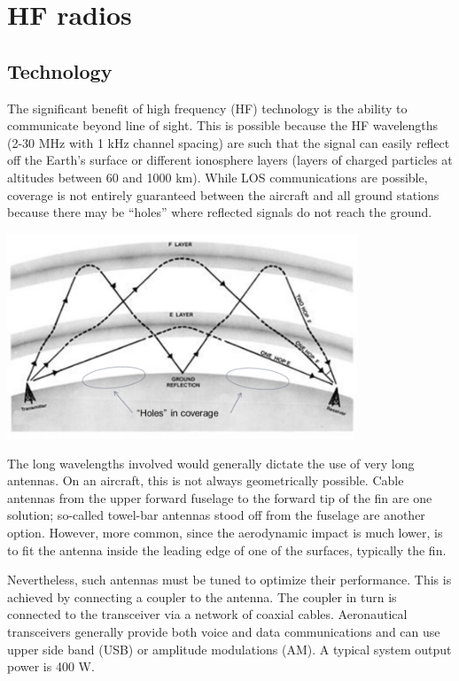 \documentclass[
]{book}
\begin{document}
\hypertarget{hf-radios}{%
\section{HF radios}\label{hf-radios}}

\hypertarget{technology-1}{%
\subsection{Technology}\label{technology-1}}

The significant benefit of high frequency (HF) technology is the ability to
communicate beyond line of sight. This is possible because the HF wavelengths
(2-30 MHz with 1 kHz channel spacing) are such that the signal can easily
reflect off the Earth's surface or different ionosphere layers (layers of
charged particles at altitudes between 60 and 1000 km). While LOS
communications are possible, coverage is not entirely guaranteed between the
aircraft and all ground stations because there may be ``holes'' where reflected
signals do not reach the ground.

\includegraphics[width=4.11in,height=2.41in]{media/20/image5.png}

The long wavelengths involved would generally dictate the use of very long
antennas. On an aircraft, this is not always geometrically possible. Cable
antennas from the upper forward fuselage to the forward tip of the fin are one
solution; so-called towel-bar antennas stood off from the fuselage are another
option. However, more common, since the aerodynamic impact is much lower, is to
fit the antenna inside the leading edge of one of the surfaces, typically the
fin.

Nevertheless, such antennas must be tuned to optimize their performance. This
is achieved by connecting a coupler to the antenna. The coupler in turn is
connected to the transceiver via a network of coaxial cables. Aeronautical
transceivers generally provide both voice and data communications and can use
upper side band (USB) or amplitude modulations (AM). A typical system output
power is 400 W.
\end{document}
